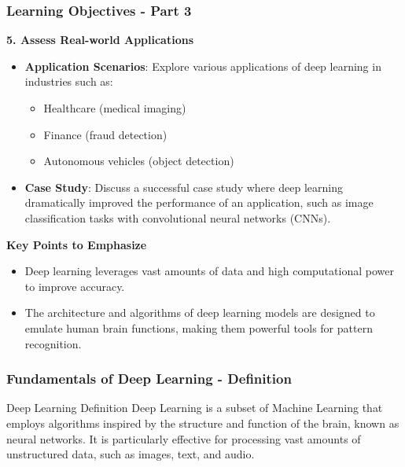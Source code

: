 \documentclass{beamer}
\begin{document}
\begin{frame}[fragile]
    \frametitle{Learning Objectives - Part 3}
    \textbf{5. Assess Real-world Applications}
    \begin{itemize}
        \item \textbf{Application Scenarios}: Explore various applications of deep learning in industries such as:
        \begin{itemize}
            \item Healthcare (medical imaging)
            \item Finance (fraud detection)
            \item Autonomous vehicles (object detection)
        \end{itemize}
        \item \textbf{Case Study}: Discuss a successful case study where deep learning dramatically improved the performance of an application, such as image classification tasks with convolutional neural networks (CNNs).
    \end{itemize}

    \textbf{Key Points to Emphasize}
    \begin{itemize}
        \item Deep learning leverages vast amounts of data and high computational power to improve accuracy.
        \item The architecture and algorithms of deep learning models are designed to emulate human brain functions, making them powerful tools for pattern recognition.
    \end{itemize}
\end{frame}

\begin{frame}[fragile]
    \frametitle{Fundamentals of Deep Learning - Definition}
    \begin{block}{Deep Learning Definition}
        Deep Learning is a subset of Machine Learning that employs algorithms inspired by the structure and function of the brain, known as neural networks. 
        It is particularly effective for processing vast amounts of unstructured data, such as images, text, and audio.
    \end{block}
\end{frame}
\end{document}
